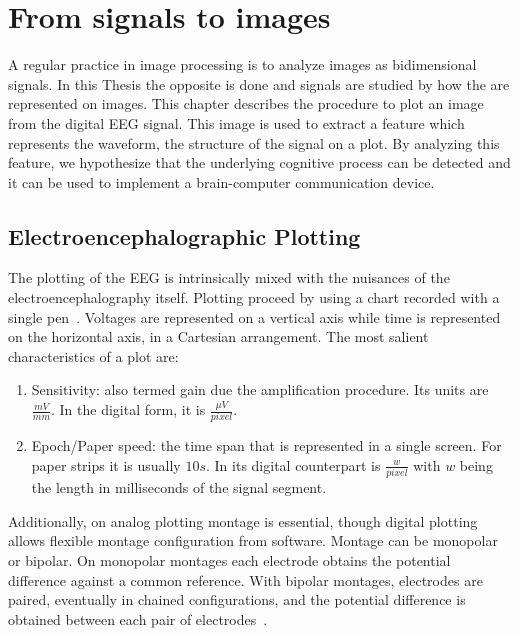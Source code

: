 \chapter{From signals to images}
\label{chapter:two}


A regular practice in image processing is to analyze images as bidimensional signals.  In this Thesis the opposite is done and signals are studied by how the are represented on images. This chapter describes the procedure to plot an image from the digital EEG signal.  This image is used to extract a feature which represents the waveform, the structure of the signal on a plot.  By analyzing this feature, we hypothesize that the underlying cognitive process can be detected and it can be used to implement a brain-computer communication device.

\section{Electroencephalographic Plotting}

The plotting of the EEG is intrinsically mixed with the nuisances of the electroencephalography itself.  Plotting proceed by using a chart recorded with a single pen~\cite{Jestico1977}.   Voltages are represented on a vertical axis while time is represented on the horizontal axis, in a Cartesian arrangement.  The most salient characteristics of a plot are:

\begin{enumerate}
\item Sensitivity: also termed gain due the amplification procedure.  Its units are $ \frac{mV}{mm}$.  In the digital form, it is $\frac{\mu V}{pixel}$.
\item Epoch/Paper speed: the time span that is represented in a single screen.  For paper strips it is usually $10s$.  In its digital counterpart is $ \frac{w}{pixel}$ with $w$ being the length in milliseconds of the signal segment.
\end{enumerate}

Additionally, on analog plotting montage is essential, though digital plotting allows flexible montage configuration from software.  Montage can be monopolar or bipolar.  On monopolar montages each electrode obtains the potential difference against a common reference. With bipolar montages, electrodes are paired, eventually in chained configurations, and the potential difference is obtained between each pair of electrodes~\cite{EEGIntro}.

